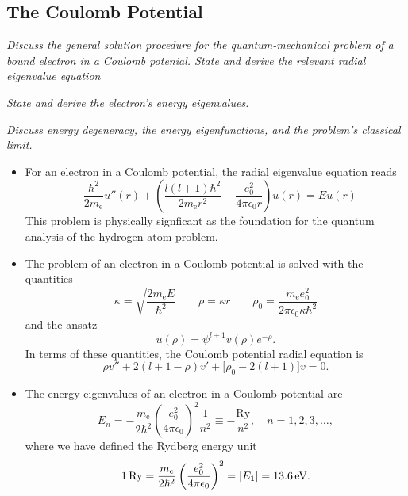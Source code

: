 \documentclass[11pt, a4paper]{article}
\begin{document}
\subsection{The Coulomb Potential}
\textit{Discuss the general solution procedure for the quantum-mechanical problem of a bound electron in a Coulomb potenial. State and derive the relevant radial eigenvalue equation}

\vspace{2mm}
\textit{State and derive the electron's energy eigenvalues.}

\vspace{2mm}
\textit{Discuss energy degeneracy, the energy eigenfunctions, and the problem's classical limit.}

\begin{itemize}
    \item For an electron in a Coulomb potential, the radial eigenvalue equation reads
	\begin{equation*}
		-\frac{\hbar^{2}}{2m_{\text{e}}}u''(r) + \left(\frac{l (l+1)\hbar^{2}}{2m_{\text{e}}r^{2}} - \frac{e_{0}^{2}}{4\pi \epsilon_{0}r}\right)u(r) = Eu(r)
	\end{equation*}
    This problem is physically signficant as the foundation for the quantum analysis of the hydrogen atom problem.

    \item The problem of an electron in a Coulomb potential is solved with the quantities
    \begin{equation*}
        \kappa = \sqrt{\frac{2m_{\text{e}}E}{\hbar^{2}}} \qquad \rho = \kappa r \qquad \rho_{0} = \frac{m_{\text{e}}e_{0}^{2}}{2\pi \epsilon_{0} \kappa \hbar^{2}}
    \end{equation*}
    and the ansatz
    \begin{equation*}
        u(\rho) = \psi^{l + 1}v(\rho)e^{-\rho}.
    \end{equation*}
    In terms of these quantities, the Coulomb potential radial equation is
    \begin{equation*}
        \rho v'' + 2(l + 1 - \rho)v' + \big[ \rho_{0} - 2(l + 1) \big]v = 0.
    \end{equation*}
    
    
	\item The energy eigenvalues of an electron in a Coulomb potential are
	\begin{equation*}
		E_{n} = - \frac{m_{\text{e}}}{2\hbar^{2}}\left(\frac{e_{0}^{2}}{4\pi \epsilon_{0}}\right)^{2}\frac{1}{n^{2}} \equiv - \frac{\text{Ry}}{n^{2}}, \quad n = 1, 2, 3, \ldots,
	\end{equation*}
	where we have defined the Rydberg energy unit
	\begin{equation*}
		\SI{1}{Ry} = \frac{m_{\text{e}}}{2\hbar^{2}}\left(\frac{e_{0}^{2}}{4\pi \epsilon_{0}}\right)^{2} = \abs{E_{1}} = \SI{13.6}{\electronvolt}.
	\end{equation*}
    

\end{itemize}
\end{document}
